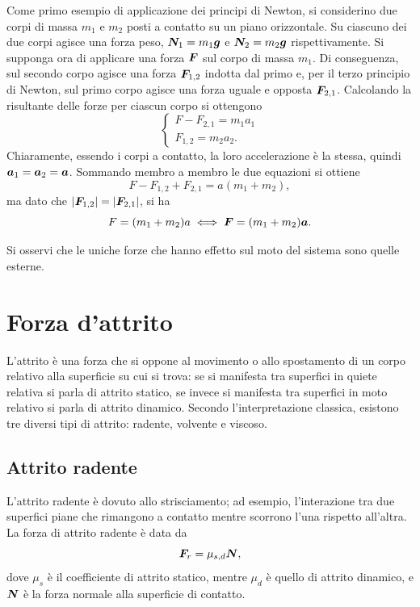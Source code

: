 \begin{ex}
    Come primo esempio di applicazione dei principi di Newton, si considerino due corpi di massa $m_1$ e $m_2$ posti a contatto su un piano orizzontale. Su ciascuno dei due corpi agisce una forza peso, $\bm{N}_1=m_1\bm{g}$ e $\bm{N}_2=m_2\bm{g}$ rispettivamente. Si supponga ora di applicare una forza $\bm{F}$ sul corpo di massa $m_1$. Di conseguenza, sul secondo corpo agisce una forza $\bm{F}_{1,2}$ indotta dal primo e, per il terzo principio di Newton, sul primo corpo agisce una forza uguale e opposta $\bm{F}_{2,1}$. Calcolando la risultante delle forze per ciascun corpo si ottengono
\begin{equation}
    \begin{cases}
        F-F_{2,1}=m_1a_1 \\
        F_{1,2}=m_2a_2.
    \end{cases}
\end{equation}
Chiaramente, essendo i corpi a contatto, la loro accelerazione è la stessa, quindi $\bm{a}_1=\bm{a}_2=\bm{a}$. Sommando membro a membro le due equazioni si ottiene
\begin{equation}
    F-F_{1,2}+F_{2,1}=a(m_1+m_2),
\end{equation}
ma dato che $|\bm{F}_{1,2}|=|\bm{F}_{2,1}|$, si ha
\begin{equation}
    F=(m_1+m_2)a\iff\bm{F}=(m_1+m_2)\bm{a}.
\end{equation}
\begin{obs}
    Si osservi che le uniche forze che hanno effetto sul moto del sistema sono quelle esterne.
\end{obs}
\end{ex}

\section{Forza d'attrito}
L'attrito è una forza che si oppone al movimento o allo spostamento di un corpo relativo alla superficie su cui si trova: se si manifesta tra superfici in quiete relativa si parla di attrito statico, se invece si manifesta tra superfici in moto relativo si parla di attrito dinamico. Secondo l'interpretazione classica, esistono tre diversi tipi di attrito: radente, volvente e viscoso. 

\subsection{Attrito radente}
L'attrito radente è dovuto allo strisciamento; ad esempio, l'interazione tra due superfici piane che rimangono a contatto mentre scorrono l'una rispetto all'altra. La forza di attrito radente è data da 
\begin{equation}
    \bm{F}_r=\mu_{s,d}\bm{N},
\end{equation}
dove $\mu_{s}$ è il coefficiente di attrito statico, mentre $\mu_{d}$ è quello di attrito dinamico, e $\bm{N}$ è la forza normale alla superficie di contatto. 

